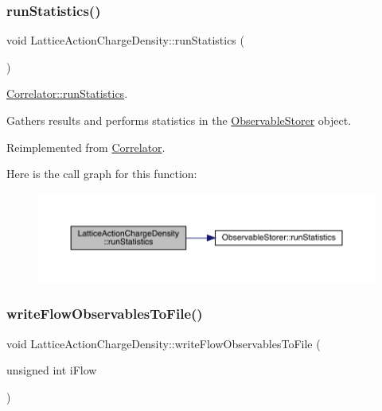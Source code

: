 \subsubsection{\texorpdfstring{runStatistics()}{runStatistics()}}
{\footnotesize\ttfamily void Lattice\+Action\+Charge\+Density\+::run\+Statistics (\begin{DoxyParamCaption}{ }\end{DoxyParamCaption})\hspace{0.3cm}{\ttfamily [virtual]}}



\mbox{\hyperlink{class_correlator_a35197b1d12b62ef30b79c0138a26456e}{Correlator\+::run\+Statistics}}. 

Gathers results and performs statistics in the \mbox{\hyperlink{class_observable_storer}{Observable\+Storer}} object. 

Reimplemented from \mbox{\hyperlink{class_correlator_a35197b1d12b62ef30b79c0138a26456e}{Correlator}}.

Here is the call graph for this function\+:\nopagebreak
\begin{figure}[H]
\begin{center}
\leavevmode
\includegraphics[width=350pt]{class_lattice_action_charge_density_a21d608703811d2814e7f654588eaa0c0_cgraph}
\end{center}
\end{figure}
\mbox{\label{class_lattice_action_charge_density_a54226556dc1497c311e4a4d50bf44c26}} 
\subsubsection{\texorpdfstring{writeFlowObservablesToFile()}{writeFlowObservablesToFile()}}
{\footnotesize\ttfamily void Lattice\+Action\+Charge\+Density\+::write\+Flow\+Observables\+To\+File (\begin{DoxyParamCaption}\item[{unsigned int}]{i\+Flow }\end{DoxyParamCaption})\hspace{0.3cm}{\ttfamily [virtual]}}



